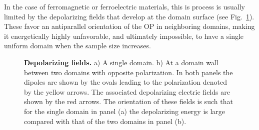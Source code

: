 In the case of ferromagnetic or ferroelectric materials, this is process is usually limited by the depolarizing fields that develop at the domain surface (see Fig.~\ref{fig:BTO_depolarizing_schematic}).
These favor an antiparallel orientation of the OP in neighboring domains, making it energetically highly unfavorable, and ultimately impossible, to have a single uniform domain when the sample size increases.
\begin{figure}[h]
	\caption{\label{fig:BTO_depolarizing_schematic}{\bf Depolarizing fields.} a) A single domain. b) At a domain wall between two domains with opposite polarization. In both panels the dipoles are shown by the ovals leading to the polarization denoted by the yellow arrows. The associated depolarizing electric fields are shown by the red arrows. The orientation of these fields is such that for the single domain in panel (a) the depolarizing energy is large compared with that of the two domains in panel (b).}    
\end{figure}

